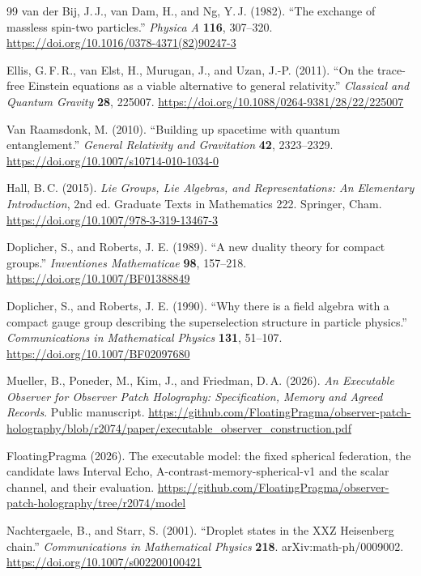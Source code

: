 \documentclass[11pt]{article}
\theoremstyle{definition}
\theoremstyle{remark}
\begin{document}
{\begin{thebibliography}{99}
van der Bij, J.\,J., van Dam, H., and Ng, Y.\,J. (1982). ``The exchange
of massless spin-two particles.'' \emph{Physica A} \textbf{116},
307--320.
\url{https://doi.org/10.1016/0378-4371(82)90247-3}

Ellis, G.\,F.\,R., van Elst, H., Murugan, J., and Uzan, J.-P. (2011).
``On the trace-free Einstein equations as a viable alternative to general
relativity.'' \emph{Classical and Quantum Gravity} \textbf{28}, 225007.
\url{https://doi.org/10.1088/0264-9381/28/22/225007}

Van Raamsdonk, M. (2010). ``Building up spacetime with quantum entanglement.''
\emph{General Relativity and Gravitation} \textbf{42}, 2323--2329.
\url{https://doi.org/10.1007/s10714-010-1034-0}

Hall, B.\,C. (2015). \emph{Lie Groups, Lie Algebras, and Representations:
An Elementary Introduction}, 2nd ed. Graduate Texts in Mathematics 222.
Springer, Cham.
\url{https://doi.org/10.1007/978-3-319-13467-3}

Doplicher, S., and Roberts, J. E. (1989). ``A new duality theory for compact
groups.'' \emph{Inventiones Mathematicae} \textbf{98}, 157--218.
\url{https://doi.org/10.1007/BF01388849}

Doplicher, S., and Roberts, J. E. (1990). ``Why there is a field algebra with
a compact gauge group describing the superselection structure in particle
physics.'' \emph{Communications in Mathematical Physics} \textbf{131},
51--107.
\url{https://doi.org/10.1007/BF02097680}

Mueller, B., Poneder, M., Kim, J., and Friedman, D.\,A. (2026). \emph{An Executable Observer for Observer
Patch Holography: Specification, Memory and Agreed Records}. Public manuscript.
\url{https://github.com/FloatingPragma/observer-patch-holography/blob/r2074/paper/executable_observer_construction.pdf}

FloatingPragma (2026). The executable model: the fixed spherical federation,
the candidate laws Interval Echo, A-contrast-memory-spherical-v1 and the
scalar channel, and their evaluation.
\url{https://github.com/FloatingPragma/observer-patch-holography/tree/r2074/model}

Nachtergaele, B., and Starr, S. (2001). ``Droplet states in the XXZ
Heisenberg chain.'' \emph{Communications in Mathematical Physics}
\textbf{218}. arXiv:math-ph/0009002.
\url{https://doi.org/10.1007/s002200100421}


\end{thebibliography}}
\end{document}

